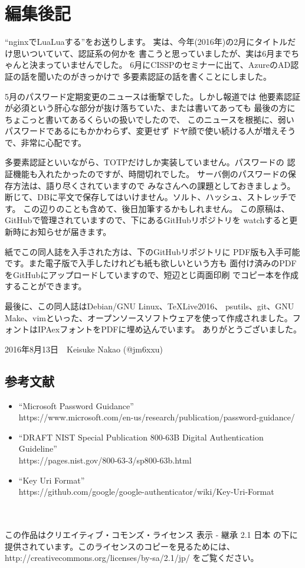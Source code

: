 \section*{編集後記}
``nginxでLuaLuaする''をお送りします。
実は、今年(2016年)の2月にタイトルだけ思いついていて、認証系の何かを
書こうと思っていましたが、実は6月までちゃんと決まっていませんでした。
6月にCISSPのセミナーに出て、AzureのAD認証の話を聞いたのがきっかけで
多要素認証の話を書くことにしました。

5月のパスワード定期変更のニュースは衝撃でした。しかし報道では
他要素認証が必須という肝心な部分が抜け落ちていた、または書いてあっても
最後の方にちょこっと書いてあるくらいの扱いでしたので、
このニュースを根拠に、弱いパスワードであるにもかかわらず、変更せず
ドヤ顔で使い続ける人が増えそうで、非常に心配です。


多要素認証といいながら、TOTPだけしか実装していません。パスワードの
認証機能も入れたかったのですが、時間切れでした。
サーバ側のパスワードの保存方法は、語り尽くされていますので
みなさんへの課題としておきましょう。
断じて、DBに平文で保存してはいけません。ソルト、ハッシュ、ストレッチです。
この辺りのことも含めて、後日加筆するかもしれません。
この原稿は、GitHubで管理されていますので、下にあるGitHubリポジトリを
watchすると更新時にお知らせが届きます。

紙でこの同人誌を入手された方は、下のGitHubリポジトリに
PDF版も入手可能です。また電子版で入手したけれども紙も欲しいという方も
面付け済みのPDFをGitHubにアップロードしていますので、短辺とじ両面印刷
でコピー本を作成することができます。

最後に、この同人誌はDebian/GNU Linux、\TeX Live2016、
psutils、git、GNU Make、vimといった、オープンソースソフトウェアを使って作成されました。フォントはIPAexフォントをPDFに埋め込んでいます。
ありがとうございました。

\begin{flushright}
2016年8月13日　Keisuke Nakao (@jm6xxu) 
\end{flushright}
\subsection*{参考文献}
\begin{itemize}

\item ``Microsoft Password Guidance'' \\
https://www.microsoft.com/en-us/research/publication/password-guidance/
\item ``DRAFT NIST Special Publication 800-63B Digital Authentication Guideline''\\
https://pages.nist.gov/800-63-3/sp800-63b.html
\item ``Key Uri Format''\\
https://github.com/google/google-authenticator/wiki/Key-Uri-Format
\end{itemize}
\mbox{}\\
\vspace{48em}\\
この作品はクリエイティブ・コモンズ・ライセンス 表示 - 継承 2.1 日本 の下に提供されています。このライセンスのコピーを見るためには、http://creativecommons.org/licenses/by-sa/2.1/jp/ をご覧ください。
